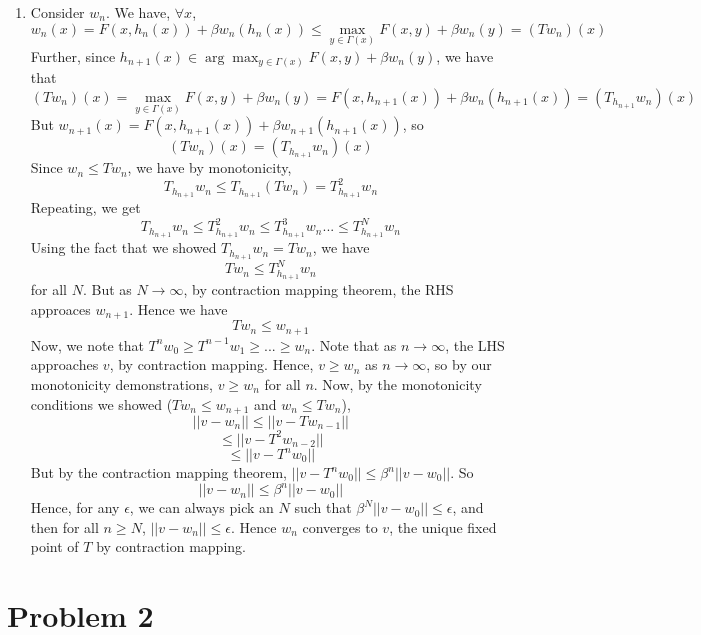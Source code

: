 \documentclass[10pt,letter]{article}
\newcommand{\problem}[1]{\section*{Problem #1}}
\begin{document}
\begin{enumerate}[label=(\alph*)]
\item Consider $w_n$. We have, $\forall x$,
\[ w_n(x) = F(x, h_n(x)) + \beta w_n(h_n(x)) \le \max_{y \in \Gamma(x)} F(x, y) + \beta w_n(y) = (Tw_n)(x) \]
Further, since $h_{n+1}(x) \in \arg \max_{y \in \Gamma(x)} F(x, y) + \beta w_n(y)$, we have that
\[ (Tw_n)(x) = \max_{y \in \Gamma(x)} F(x, y) + \beta w_n(y) = F(x, h_{n+1}(x)) + \beta w_n(h_{n+1}(x)) = (T_{h_{n+1}}w_n)(x)   \]
But $w_{n+1}(x) = F(x, h_{n+1}(x)) + \beta w_{n+1}(h_{n+1}(x))$, so
\[ (Tw_n)(x) = (T_{h_{n+1}}w_n)(x) \]
Since $w_n \le Tw_n$, we have by monotonicity,
\[ T_{h_{n+1}}w_n \le T_{h_{n+1}} (Tw_n) = T^2_{h_{n+1}}w_n \]
Repeating, we get
\[ T_{h_{n+1}}w_n  \le T^2_{h_{n+1}}w_n \le T^3_{h_{n+1}}w_n ... \le T^N_{h_{n+1}}w_n \]
Using the fact that we showed $T_{h_{n+1}}w_n = Tw_n$, we have
\[ Tw_n \le T^N_{h_{n+1}}w_n\]
for all $N$. But as $N \to \infty$, by contraction mapping theorem, the RHS approaces $w_{n+1}$. Hence we have
\[ Tw_n \le w_{n+1} \]
Now, we note that $T^n w_0 \ge T^{n-1} w_{1} \ge ... \ge w_n $. Note that as $n \to \infty$, the LHS approaches $v$, by contraction mapping. Hence, $v \ge w_n$ as $n \to \infty$, so by our monotonicity demonstrations, $v \ge w_n$ for all $n$.
Now, by the monotonicity conditions we showed ($Tw_n \le w_{n+1}$ and $w_n \le Tw_n$),
\[ || v - w_n|| \le || v- Tw_{n-1} || \]
\[ \le || v - T^2w_{n-2}  || \]
\[ \le || v - T^nw_0  || \]
But by the contraction mapping theorem, $|| v - T^n w_0|| \le \beta^n ||v - w_0||$. So
\[ || v - w_n||  \le \beta^n ||v - w_0|| \]
Hence, for any $\epsilon$, we can always pick an $N$ such that $\beta^N ||v - w_0|| \le \epsilon$, and then for all $n\ge N$, $ ||v - w_n || \le \epsilon$. Hence $w_n$ converges to $v$, the unique fixed point of $T$ by contraction mapping.
\end{enumerate}
\problem{2}
\end{document}
